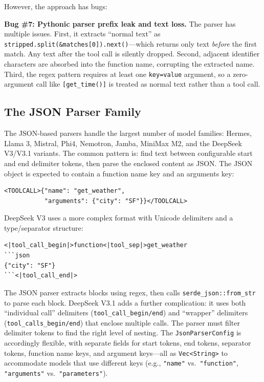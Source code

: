 However, the approach has bugs:

\begin{bugbox}
\textbf{Bug \#7: Pythonic parser prefix leak and text loss.} The parser has multiple issues. First, it extracts ``normal text'' as \texttt{stripped.split(\&matches[0]).next()}---which returns only text \emph{before} the first match. Any text after the tool call is silently dropped. Second, adjacent identifier characters are absorbed into the function name, corrupting the extracted name. Third, the regex pattern requires at least one \texttt{key=value} argument, so a zero-argument call like \texttt{[get\_time()]} is treated as normal text rather than a tool call.
\end{bugbox}

\subsection{The JSON Parser Family}

The JSON-based parsers handle the largest number of model families: Hermes, Llama 3, Mistral, Phi4, Nemotron, Jamba, MiniMax M2, and the DeepSeek V3/V3.1 variants. The common pattern is: find text between configurable start and end delimiter tokens, then parse the enclosed content as JSON. The JSON object is expected to contain a function name key and an arguments key:

\begin{verbatim}
<TOOLCALL>{"name": "get_weather",
           "arguments": {"city": "SF"}}</TOOLCALL>
\end{verbatim}

DeepSeek V3 uses a more complex format with Unicode delimiters and a type/separator structure:

\begin{verbatim}
<|tool_call_begin|>function<|tool_sep|>get_weather
```json
{"city": "SF"}
```<|tool_call_end|>
\end{verbatim}

The JSON parser extracts blocks using regex, then calls \texttt{serde\_json::from\_str} to parse each block. DeepSeek V3.1 adds a further complication: it uses both ``individual call'' delimiters (\texttt{tool\_call\_begin/end}) and ``wrapper'' delimiters (\texttt{tool\_calls\_begin/end}) that enclose multiple calls. The parser must filter delimiter tokens to find the right level of nesting. The \texttt{JsonParserConfig} is accordingly flexible, with separate fields for start tokens, end tokens, separator tokens, function name keys, and argument keys---all as \texttt{Vec<String>} to accommodate models that use different keys (e.g., \texttt{"name"} vs.\ \texttt{"function"}, \texttt{"arguments"} vs.\ \texttt{"parameters"}).

